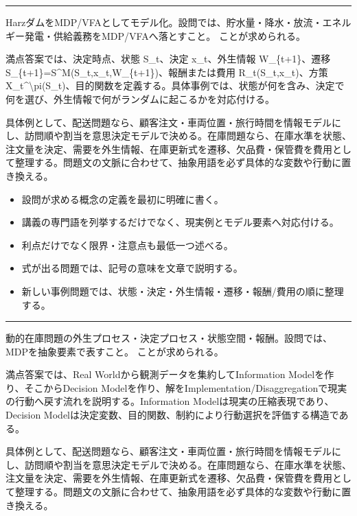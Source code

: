 \vspace{2mm}\hrule\vspace{2mm}
HarzダムをMDP/VFAとしてモデル化。設問では、貯水量・降水・放流・エネルギー発電・供給義務をMDP/VFAへ落とすこと。 ことが求められる。\par
{}
満点答案では、決定時点、状態 S\_t、決定 x\_t、外生情報 W\_\{t+1\}、遷移 S\_\{t+1\}=S\textasciicircum{}M(S\_t,x\_t,W\_\{t+1\})、報酬または費用 R\_t(S\_t,x\_t)、方策 X\_t\textasciicircum{}\textbackslash{}pi(S\_t)、目的関数を定義する。具体事例では、状態が何を含み、決定で何を選び、外生情報で何がランダムに起こるかを対応付ける。\par
{}
具体例として、配送問題なら、顧客注文・車両位置・旅行時間を情報モデルにし、訪問順や割当を意思決定モデルで決める。在庫問題なら、在庫水準を状態、注文量を決定、需要を外生情報、在庫更新式を遷移、欠品費・保管費を費用として整理する。問題文の文脈に合わせて、抽象用語を必ず具体的な変数や行動に置き換える。\par
{}
\begin{itemize}
\item 設問が求める概念の定義を最初に明確に書く。
\item 講義の専門語を列挙するだけでなく、現実例とモデル要素へ対応付ける。
\item 利点だけでなく限界・注意点も最低一つ述べる。
\item 式が出る問題では、記号の意味を文章で説明する。
\item 新しい事例問題では、状態・決定・外生情報・遷移・報酬/費用の順に整理する。
\end{itemize}
\vspace{2mm}\hrule\vspace{2mm}
動的在庫問題の外生プロセス・決定プロセス・状態空間・報酬。設問では、MDPを抽象要素で表すこと。 ことが求められる。\par
{}
満点答案では、Real Worldから観測データを集約してInformation Modelを作り、そこからDecision Modelを作り、解をImplementation/Disaggregationで現実の行動へ戻す流れを説明する。Information Modelは現実の圧縮表現であり、Decision Modelは決定変数、目的関数、制約により行動選択を評価する構造である。\par
{}
具体例として、配送問題なら、顧客注文・車両位置・旅行時間を情報モデルにし、訪問順や割当を意思決定モデルで決める。在庫問題なら、在庫水準を状態、注文量を決定、需要を外生情報、在庫更新式を遷移、欠品費・保管費を費用として整理する。問題文の文脈に合わせて、抽象用語を必ず具体的な変数や行動に置き換える。\par
